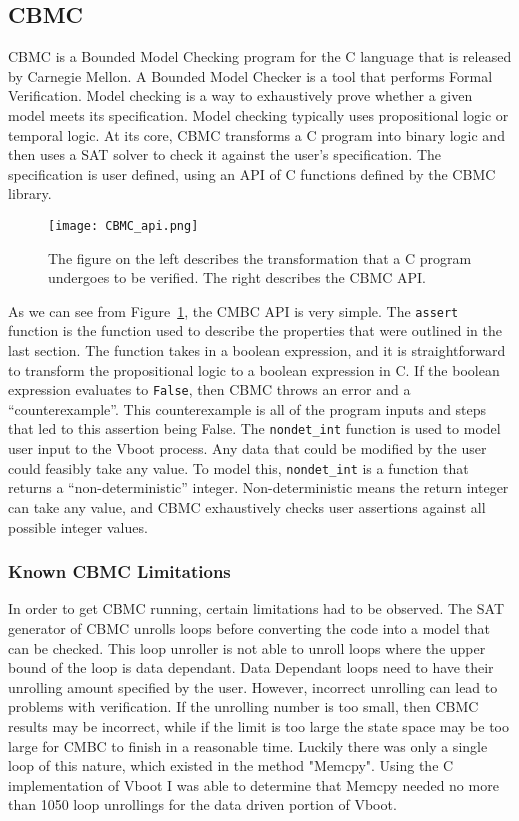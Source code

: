 \documentclass[../report.tex]{subfiles}
\def\code#1{\texttt{#1}}
\begin{document}
\subsection{CBMC}

CBMC is a Bounded Model Checking program for the C language that is released by
Carnegie Mellon. 
A Bounded Model Checker is a tool that performs Formal Verification.
Model checking is a way to exhaustively prove whether a given model meets its
specification.
Model checking typically uses propositional logic or temporal logic. 
At its core, CBMC transforms a C program into binary logic and
then uses a SAT solver to check it against the user's specification. 
The specification is user defined, using an API of C functions defined by the
CBMC library. 

\begin{figure}
  \centering
  \texttt{[image: CBMC\_api.png]}
  \caption{The figure on the left describes the transformation that a C
  program undergoes to be verified. The right describes the CBMC API.}\label{fig:CBMC_api}
\end{figure}

As we can see from Figure~\ref{fig:CBMC_api}, the CMBC API is very simple.
The \code{assert} function is the function used to describe the properties that
were outlined in the last section. 
The function takes in a boolean expression, and it is straightforward to
transform the propositional logic to a boolean expression in C.
If the boolean expression evaluates to \code{False}, then CBMC throws an error
and a ``counterexample''.
This counterexample is all of the program inputs and steps that led to this
assertion being False.
The \code{nondet\_int} function is used to model user input to the Vboot process.
Any data that could be modified by the user could feasibly take any
value.
To model this, \code{nondet\_int} is a function that returns a
``non-deterministic'' integer. 
Non-deterministic means the return integer can take any value, and CBMC
exhaustively checks user assertions against all possible integer values.

\subsubsection{Known CBMC Limitations}

In order to get CBMC running, certain limitations had to be observed.
The SAT generator of CBMC unrolls loops before converting the code into a model that can be checked.
This loop unroller is not able to unroll loops where the upper bound of the loop is data dependant.
Data Dependant loops need to have their unrolling amount specified by the user.
However, incorrect unrolling can lead to problems with verification.
If the unrolling number is too small, then CBMC results may be incorrect, while if the limit is too large the state space may be too large for CMBC to finish in a reasonable time.
Luckily there was only a single loop of this nature, which existed in the method "Memcpy".
Using the C implementation of Vboot I was able to determine that Memcpy needed no more than 1050 loop unrollings for the data driven portion of Vboot.
\end{document}
